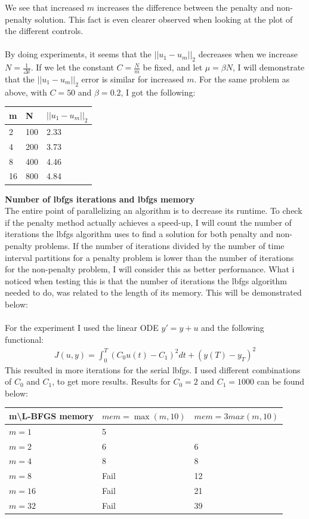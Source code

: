 \documentclass[11pt,a4paper]{report}
\begin{document}
We see that increased $m$ increases the difference between the penalty and non-penalty solution. This fact is even clearer observed when looking at the plot of the different controls.
\\
\\
By doing experiments, it seems that the  $||u_1-u_m||_2$ decreases when we increase $N=\frac{1}{\Delta t}$.  If we let the constant $C= \frac{N}{m}$ be fixed, and let $\mu=\beta N$, I will demonstrate that the $||u_1-u_m||_2$ error is similar for increased $m$. For the same problem as above, with $C=50$ and $\beta=0.2$, I got the following:
\begin{center}
    \begin{tabular}{| l | l | l |}
    \hline
    m &  N&$ ||u_1-u_m||_2$ \\ \hline
    2 & 100 &2.33\\ \hline
    4 & 200 &3.73\\ \hline
    8 & 400 &4.46\\ \hline
    16 & 800 &4.84 \\ \hline
    \end{tabular}
\end{center}
\textbf{Number of lbfgs iterations and lbfgs memory}
\\
The entire point of parallelizing an algorithm is to decrease its runtime. To check if the penalty method actually achieves a speed-up, I will count the number of iterations the lbfgs algorithm uses to find a solution for both penalty and non-penalty problems. If the number of iterations divided by the number of time interval partitions for a penalty problem is lower than the number of iterations for the non-penalty problem, I will consider this as better performance. What i noticed when testing this is that the number of iterations the lbfgs algorithm needed to do, was related to the length of its memory. This will be demonstrated below: 
\\
\\   
For the experiment I used the linear ODE $y'=y+u$ and the following functional: 
\begin{align*}
J(u,y)=\int_0^T (C_0u(t)-C_1)^2dt + (y(T)-y_T)^2
\end{align*}
This resulted in more iterations for the serial lbfgs. I used different combinations of $C_0$ and $C_1$, to get more results. Results for $C_0=2 $ and $C_1= 1000$ can be found below:
\begin{center}
    \begin{tabular}{| l | l | l |}
    \hline
    m\textbackslash L-BFGS memory & $mem =\max(m,10)$& $mem=3max(m,10)$\\ \hline
    $m=1$  &  5 &  \\ \hline
    $m=2$  &  6 &  6	\\ \hline
    $m=4$ &  8 & 8 \\ \hline
    $m=8$ &  Fail &  12	\\ \hline
    $m=16$ &  Fail & 21 \\ \hline
    $m=32$ &  Fail &  39	\\ \hline
    \end{tabular}
\end{center}
\end{document}
